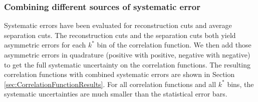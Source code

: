 \subsubsection{Combining different sources of systematic error}
\label{sec:CombiningSys}

Systematic errors have been evaluated for reconstruction cuts and average separation cuts.
The reconstruction cuts and the separation cuts both yield asymmetric errors for each $k^*$ bin of the correlation function.
We then add those asymmetric errors in quadrature (positive with positive, negative with negative) to get the full systematic uncertainty on the correlation functions.
The resulting correlation functions with combined systematic errors are shown in Section \ref{sec:CorrelationFunctionResults}.
For all correlation functions and all $k^*$ bins, the systematic uncertainties are much smaller than the statistical error bars.

